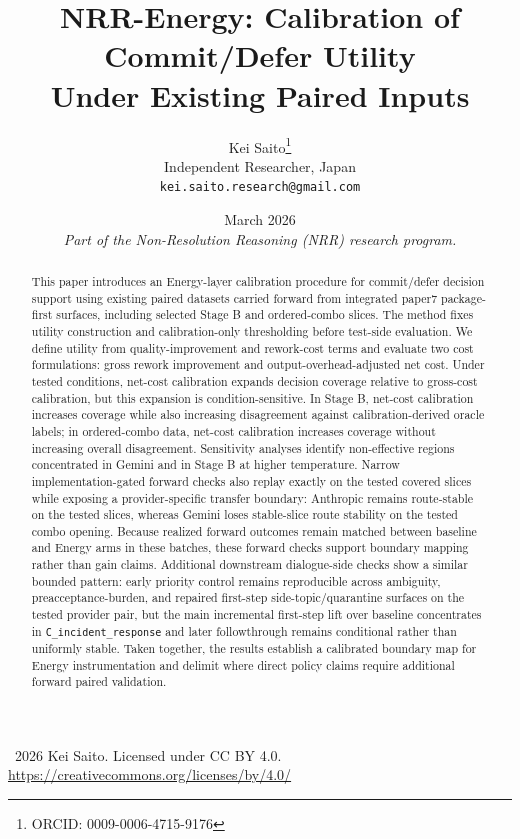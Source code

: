 \documentclass[11pt,a4paper]{article}
\title{\textbf{NRR-Energy: Calibration of Commit/Defer Utility\\Under Existing Paired Inputs}}
\author{
  Kei Saito\thanks{ORCID: 0009-0006-4715-9176} \\
  Independent Researcher, Japan \\
  \texttt{kei.saito.research@gmail.com}
}
\date{March 2026 \\[0.5em]
\textit{Part of the Non-Resolution Reasoning (NRR) research program.}}
\begin{document}
\maketitle

\begin{center}
\textcopyright\ 2026 Kei Saito.
Licensed under CC BY 4.0.\\
\url{https://creativecommons.org/licenses/by/4.0/}
\end{center}

\begin{abstract}
This paper introduces an Energy-layer calibration procedure for commit/defer decision support using existing paired datasets carried forward from integrated paper7 package-first surfaces, including selected Stage B and ordered-combo slices. The method fixes utility construction and calibration-only thresholding before test-side evaluation. We define utility from quality-improvement and rework-cost terms and evaluate two cost formulations: gross rework improvement and output-overhead-adjusted net cost. Under tested conditions, net-cost calibration expands decision coverage relative to gross-cost calibration, but this expansion is condition-sensitive. In Stage B, net-cost calibration increases coverage while also increasing disagreement against calibration-derived oracle labels; in ordered-combo data, net-cost calibration increases coverage without increasing overall disagreement. Sensitivity analyses identify non-effective regions concentrated in Gemini and in Stage B at higher temperature. Narrow implementation-gated forward checks also replay exactly on the tested covered slices while exposing a provider-specific transfer boundary: Anthropic remains route-stable on the tested slices, whereas Gemini loses stable-slice route stability on the tested combo opening. Because realized forward outcomes remain matched between baseline and Energy arms in these batches, these forward checks support boundary mapping rather than gain claims. Additional downstream dialogue-side checks show a similar bounded pattern: early priority control remains reproducible across ambiguity, preacceptance-burden, and repaired first-step side-topic/quarantine surfaces on the tested provider pair, but the main incremental first-step lift over baseline concentrates in \texttt{C\_incident\_response} and later followthrough remains conditional rather than uniformly stable. Taken together, the results establish a calibrated boundary map for Energy instrumentation and delimit where direct policy claims require additional forward paired validation.
\end{abstract}
\end{document}
